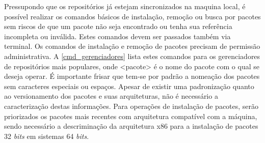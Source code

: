 Pressupondo que os repositórios já estejam sincronizados na maquina local, é possível realizar os comandos básicos de instalação, remoção ou busca por pacotes sem riscos de que um pacote não seja encontrado ou tenha sua referência incompleta ou inválida.  Estes comandos devem ser passados também via terminal. Os comandos de instalação e remoção de pacotes precisam de permissão administrativa. A \autoref{cmd_gerenciadores} lista estes comandos para os gerenciadores de repositórios mais populares, onde {\code <pacote>} é o nome do pacote com o qual se deseja operar. É importante frisar que tem-se por padrão a nomeação dos pacotes sem caracteres especiais ou espaços. Apesar de existir uma padronização quanto ao versionamento dos pacotes e suas arquiteturas, não é necessário a caracterização destas informações. Para operações de instalação de pacotes, serão priorizados os pacotes mais recentes com arquitetura compatível com a máquina, sendo necessário a descriminação da arquitetura {\code x86} para a instalação de pacotes 32 \textit{bits} em sistemas 64 \textit{bits}.

\begin{table}[htbp]
\caption{Principais comandos dos gerenciadores de repositórios mais populares.}
\label{cmd_gerenciadores}
\end{table}

